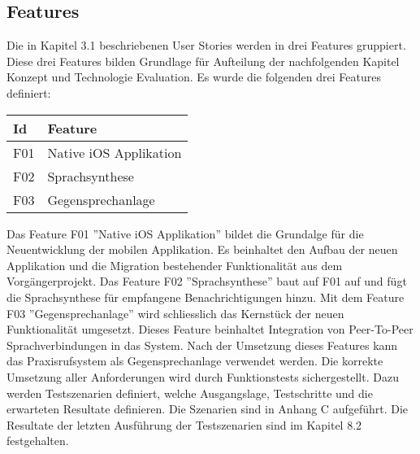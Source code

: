 \subsection{Features}

Die in Kapitel 3.1 beschriebenen User Stories werden in drei Features gruppiert.
Diese drei Features bilden Grundlage für Aufteilung der nachfolgenden Kapitel Konzept und Technologie Evaluation.
Es wurde die folgenden drei Features definiert:

\begin{table}[h]
    \centering
    \begin{tabular}{|l|p{15cm}|}
        \hline
        \textbf{Id} & \textbf{Feature}                        \\
        \hline
        F01         & Native iOS Applikation                 \\
        \hline
        F02         & Sprachsynthese                          \\
        \hline
        F03         & Gegensprechanlage                       \\
        \hline
    \end{tabular}\label{tab:features}
\end{table}

Das Feature F01 ''Native iOS Applikation'' bildet die Grundalge für die Neuentwicklung der mobilen Applikation.
Es beinhaltet den Aufbau der neuen Applikation und die Migration bestehender Funktionalität aus dem Vorgängerprojekt.
Das Feature F02 ''Sprachsynthese'' baut auf F01 auf und fügt die Sprachsynthese für empfangene Benachrichtigungen hinzu.
Mit dem Feature F03 ''Gegensprechanlage'' wird schliesslich das Kernstück der neuen Funktionalität umgesetzt.
Dieses Feature beinhaltet Integration von Peer-To-Peer Sprachverbindungen in das System.
Nach der Umsetzung dieses Features kann das Praxisrufsystem als Gegensprechanlage verwendet werden.
Die korrekte Umsetzung aller Anforderungen wird durch Funktionstests sichergestellt.
Dazu werden Testszenarien definiert, welche Ausgangslage, Testschritte und die erwarteten Resultate definieren.
Die Szenarien sind in Anhang C aufgeführt.
Die Resultate der letzten Ausführung der Testszenarien sind im Kapitel 8.2 festgehalten.

\clearpage
